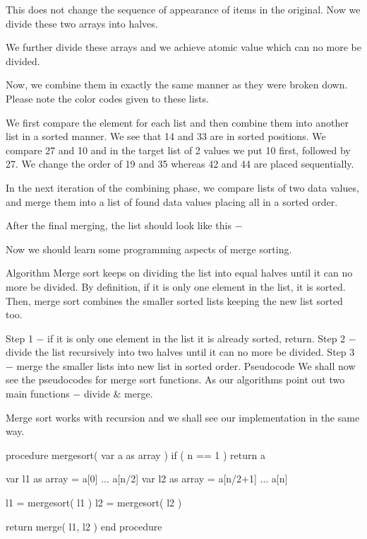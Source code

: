 This does not change the sequence of appearance of items in the original. Now we divide these two arrays into halves.



We further divide these arrays and we achieve atomic value which can no more be divided.



Now, we combine them in exactly the same manner as they were broken down. Please note the color codes given to these lists.

We first compare the element for each list and then combine them into another list in a sorted manner. We see that 14 and 33 are in sorted positions. We compare 27 and 10 and in the target list of 2 values we put 10 first, followed by 27. We change the order of 19 and 35 whereas 42 and 44 are placed sequentially.



In the next iteration of the combining phase, we compare lists of two data values, and merge them into a list of found data values placing all in a sorted order.



After the final merging, the list should look like this −



Now we should learn some programming aspects of merge sorting.

Algorithm
Merge sort keeps on dividing the list into equal halves until it can no more be divided. By definition, if it is only one element in the list, it is sorted. Then, merge sort combines the smaller sorted lists keeping the new list sorted too.

Step 1 − if it is only one element in the list it is already sorted, return.
Step 2 − divide the list recursively into two halves until it can no more be divided.
Step 3 − merge the smaller lists into new list in sorted order.
Pseudocode
We shall now see the pseudocodes for merge sort functions. As our algorithms point out two main functions − divide & merge.

Merge sort works with recursion and we shall see our implementation in the same way.

procedure mergesort( var a as array )
   if ( n == 1 ) return a

   var l1 as array = a[0] ... a[n/2]
   var l2 as array = a[n/2+1] ... a[n]

   l1 = mergesort( l1 )
   l2 = mergesort( l2 )

   return merge( l1, l2 )
end procedure

